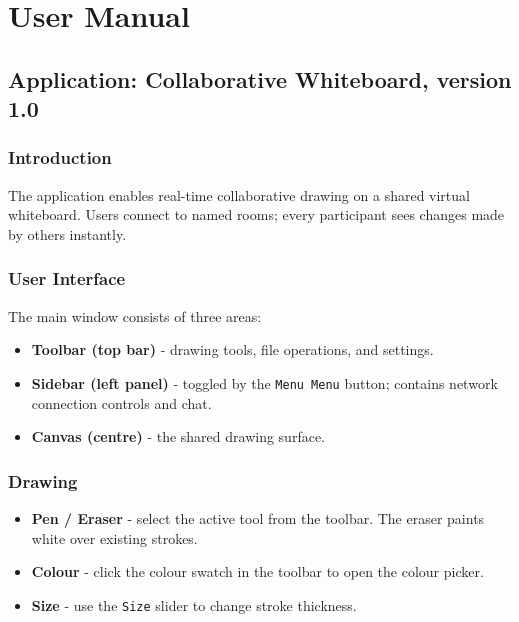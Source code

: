 \documentclass[a4paper,11pt,twoside]{report}
\theoremstyle{definition}
\begin{document}
\appendix

\chapter{User Manual}
\thispagestyle{empty}

\section*{Application: Collaborative Whiteboard, version 1.0}

\subsection*{Introduction}

The application enables real-time collaborative drawing on a shared virtual whiteboard.
Users connect to named rooms; every participant sees changes made by others instantly.

\subsection*{User Interface}

The main window consists of three areas:
\begin{itemize}
    \item \textbf{Toolbar (top bar)} - drawing tools, file operations, and settings.
    \item \textbf{Sidebar (left panel)} - toggled by the \texttt{Menu Menu} button; contains
    network connection controls and chat.
    \item \textbf{Canvas (centre)} - the shared drawing surface.
\end{itemize}

\subsection*{Drawing}

\begin{itemize}
    \item \textbf{Pen / Eraser} - select the active tool from the toolbar. The eraser
    paints white over existing strokes.
    \item \textbf{Colour} - click the colour swatch in the toolbar to open the colour
    picker.
    \item \textbf{Size} - use the \texttt{Size} slider to change stroke thickness.
\end{itemize}
\end{document}
